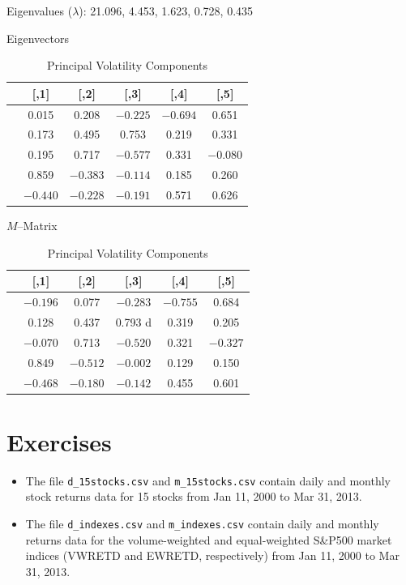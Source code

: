 	\begin{table}[H]
	\centering
	\caption{Principal Volatility Components\label{tab:pvctable}}
	{\small Eigenvalues ($\lambda$): 21.096, 4.453, 1.623, 0.728, 0.435} \par
	{\small Eigenvectors} \par
	\begin{tabular}{| l | c | c | c | c | c |} \hline
        &    [,1]   &    [,2]    &   [,3]    &   [,4]   &     [,5] \\ \hline
	[1,] & 0.015 & 0.208 & $-0.225$ & $-0.694$ &  0.651 \\ \hline
	[2,] & 0.173 & 0.495 & 0.753 & 0.219 & 0.331 \\ \hline
	[3,] & 0.195 & 0.717 & $-0.577$ & 0.331 & $-0.080$ \\ \hline
	[4,] & 0.859 & $-0.383$ & $-0.114$ & 0.185 & 0.260 \\ \hline
	[5,] & $-0.440$ & $-0.228$ & $-0.191$ & 0.571 & 0.626 \\ \hline
	\end{tabular} \par
	{\small $M$--Matrix} \par
	\begin{tabular}{| l | c | c | c | c | c |} \hline 
	         &   [,1]   &     [,2]    &     [,3]   &    [,4]   &    [,5] \\ \hline
	[1,] & $-0.196$ & 0.077 & $-0.283$ & $-0.755$ & 0.684 \\ \hline
	[2,] & 0.128 & 0.437 & 0.793 d & 0.319 & 0.205 \\ \hline
	[3,]& $-0.070$ & 0.713 & $-0.520$ & 0.321 & $-0.327$ \\ \hline
	[4,] & 0.849 & $-0.512$ & $-0.002$ & 0.129 & 0.150 \\ \hline
	[5,] & $-0.468$ & $-0.180$ & $-0.142$ & 0.455 & 0.601 \\ \hline
	\end{tabular}
	\end{table} \label{in:multimod2}



\section{Exercises}


\prob
\begin{itemize}
\item The file {\tt d\_15stocks.csv} and {\tt m\_15stocks.csv} contain daily and monthly stock returns data for 15 stocks from Jan 11, 2000 to Mar 31, 2013.
\item The file {\tt d\_indexes.csv} and {\tt m\_indexes.csv} contain daily and monthly returns data for the volume-weighted and equal-weighted S\&P500 market indices (VWRETD and EWRETD, respectively) from Jan 11, 2000 to Mar 31, 2013.
\end{itemize}

